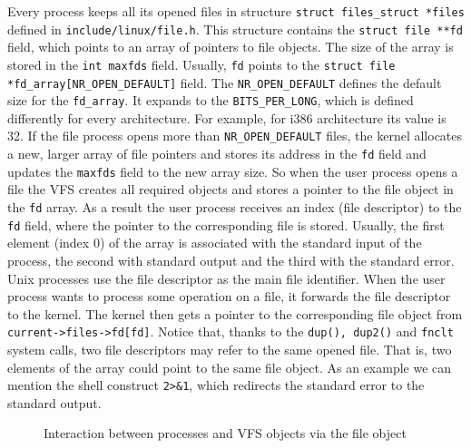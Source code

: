 Every process keeps all its opened files in structure \texttt{struct files\_struct
*files} defined in \texttt{include/linux/file.h}. This structure contains the
\texttt{struct file **fd} field, which points to an array of pointers to file objects.
The size of the array is stored in the \texttt{int maxfds} field. Usually,
\texttt{fd} points to the \texttt{struct file *fd\_array[NR\_OPEN\_DEFAULT]} field.
The \texttt{NR\_OPEN\_DEFAULT} defines the default size for the \texttt{fd\_array}. It
expands to the \texttt{BITS\_PER\_LONG}, which is defined differently for every
architecture. For example, for i386 architecture its value is 32. If the file process
opens more than \texttt{NR\_OPEN\_DEFAULT} files, the kernel allocates a new, larger
array of file pointers and stores its address in the \texttt{fd} field and updates the
\texttt{maxfds} field to the new array size. So when the user process opens a file the
VFS creates all required objects and stores a pointer to the file object in the \texttt{fd}
array. As a result the user process receives an index (file descriptor) to the \texttt{fd}
field, where the pointer to the corresponding file is stored. Usually, the first
element (index 0) of the array is associated with the standard input of the process,
the second with standard output and the third with the standard error. Unix processes
use the file descriptor as the main file identifier. When the user process wants to
process some operation on a file, it forwards the file descriptor to the kernel.
The kernel then gets a pointer to the corresponding file object from
\texttt{current->files->fd[fd]}. Notice that, thanks to the \texttt{dup(), dup2()} and
\texttt{fnclt{}} system calls, two file descriptors may refer to the same opened file.
That is, two elements of the array could point to the same file object. As an example
we can mention the shell construct \texttt{2>\&1}, which redirects the standard error
to the standard output.\\

\begin{figure}[hp]
	\begin{center}
		
	\end{center}
	\caption{Interaction between processes and VFS objects via the file object}
	\label{fig:vfs_file}
\end{figure}


